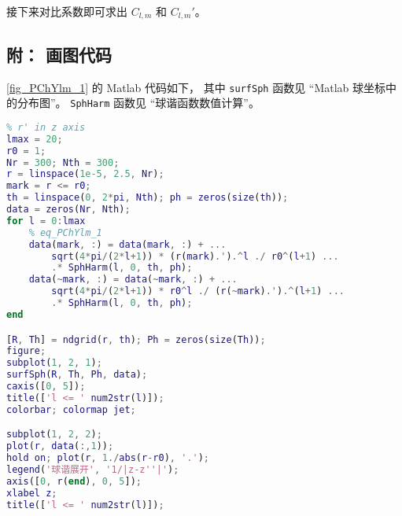 接下来对比系数即可求出 $C_{l,m}$ 和 $C_{l,m}'$。

\subsection{附： 画图代码}
\autoref{fig_PChYlm_1} 的 Matlab 代码如下， 其中 \verb|surfSph| 函数见 “Matlab 球坐标中的分布图”。 \verb|SphHarm| 函数见 “球谐函数数值计算”。
\begin{lstlisting}[language=matlab, caption=Ylm\_Coul\_exp.m]
% expansion of 1/|r-r'| into Y_lm
% r' in z axis
lmax = 20;
r0 = 1;
Nr = 300; Nth = 300;
r = linspace(1e-5, 2.5, Nr);
mark = r <= r0;
th = linspace(0, 2*pi, Nth); ph = zeros(size(th));
data = zeros(Nr, Nth);
for l = 0:lmax
    % eq_PChYlm_1
    data(mark, :) = data(mark, :) + ...
        sqrt(4*pi/(2*l+1)) * (r(mark).').^l ./ r0^(l+1) ...
        .* SphHarm(l, 0, th, ph);
    data(~mark, :) = data(~mark, :) + ...
        sqrt(4*pi/(2*l+1)) * r0^l ./ (r(~mark).').^(l+1) ...
        .* SphHarm(l, 0, th, ph);
end

[R, Th] = ndgrid(r, th); Ph = zeros(size(Th));
figure;
subplot(1, 2, 1);
surfSph(R, Th, Ph, data);
caxis([0, 5]);
title(['l <= ' num2str(l)]);
colorbar; colormap jet;

subplot(1, 2, 2);
plot(r, data(:,1));
hold on; plot(r, 1./abs(r-r0), '.');
legend('球谐展开', '1/|z-z''|');
axis([0, r(end), 0, 5]);
xlabel z;
title(['l <= ' num2str(l)]);
\end{lstlisting}
